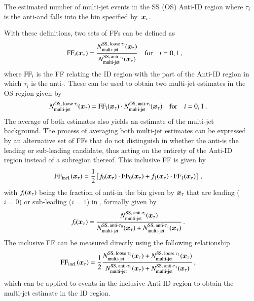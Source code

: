 {\begin{description}[style=standard]
  \item[$\NmjAntiID{SS(OS)}{i}\ffargs$] The estimated number of multi-jet events
    in the SS (OS) Anti-ID region where $\tau_i$ is the anti-\tauhadvis and
    falls into the bin specified by~$\bm{x}_\tau$.
  \end{description}
  With these definitions, two sets of FFs can be defined as
  \begin{align*}
    \text{FF}_{i}( \bm{x}_{\tau} ) &= \frac{N_\text{multi-jet}^{\text{SS, loose }\tau_{i}} ( \bm{x}_{\tau} )}{N_\text{multi-jet}^{\text{SS, anti-}\tau_{i}}( \bm{x}_{\tau} )}
                     \quad \text{for} \quad i = 0, 1 \,\text{,}
  \end{align*}
  where $\text{FF}_{i}$ is the FF relating the ID region with the part of the Anti-ID
  region in which $\tau_i$ is the anti-\tauhadvis.
  These can be used to obtain two multi-jet estimates in the OS region given by
  \begin{align*}
    N_\text{multi-jet}^{\text{OS, loose }\tau_{i}}( \bm{x}_{\tau} ) = \text{FF}_{i}( \bm{x}_{\tau} ) \cdot N_\text{multi-jet}^{\text{OS, anti-}\tau_{i}}( \bm{x}_{\tau} )
    \quad \text{for} \quad i = 0, 1 \,\text{.}
  \end{align*}
  The average of both estimates also yields an estimate of the multi-jet
  background. The process of averaging both multi-jet estimates can be expressed
  by an alternative set of FFs that do not distinguish in whether the
  anti-\tauhadvis is the leading or sub-leading \tauhadvis candidate, thus
  acting on the entirety of the Anti-ID region instead of a subregion
  thereof. This inclusive FF is given by
  \begin{align*}
    \text{FF}_\text{incl.}( \bm{x}_{\tau} ) = \frac{1}{2} \left[ f_0( \bm{x}_{\tau} ) \cdot \text{FF}_0( \bm{x}_{\tau} )
    + f_1( \bm{x}_{\tau} ) \cdot \text{FF}_1( \bm{x}_{\tau} ) \right] \,\text{,}
  \end{align*}
  with $f_i( \bm{x}_{\tau} )$ being the fraction of anti-\tauhadvis in the bin given by
  $\bm{x}_\tau$ that are leading ($i = 0$) or sub-leading ($i = 1$) in \pT,
  formally given by
  \begin{align*}
    f_i( \bm{x}_{\tau} ) = \frac{N_\text{multi-jet}^{\text{SS, anti-}\tau_{i}}( \bm{x}_{\tau} )}
                      {N_\text{multi-jet}^{\text{SS, anti-}\tau_{0}}( \bm{x}_{\tau} ) + N_\text{multi-jet}^{\text{SS, anti-}\tau_{1}}( \bm{x}_{\tau} )} \,\text{.}
  \end{align*}
  The inclusive FF can be measured directly using the following relationship
  \begin{align}
    \text{FF}_\text{incl.}( \bm{x}_{\tau} )
    = \frac{1}{2} \frac{ N_\text{multi-jet}^{\text{SS, loose }\tau_{0}}( \bm{x}_{\tau} ) + N_\text{multi-jet}^{\text{SS, loose }\tau_{1}}( \bm{x}_{\tau} ) }
                       { N_\text{multi-jet}^{\text{SS, anti-}\tau_{0}}( \bm{x}_{\tau} ) + N_\text{multi-jet}^{\text{SS, anti-}\tau_{1}}( \bm{x}_{\tau} ) } \,\text{,}
    \label{eq:inclusive_fake_factor}
  \end{align}
  which can be applied to events in the inclusive Anti-ID region to obtain the
  multi-jet estimate in the ID region.

}
